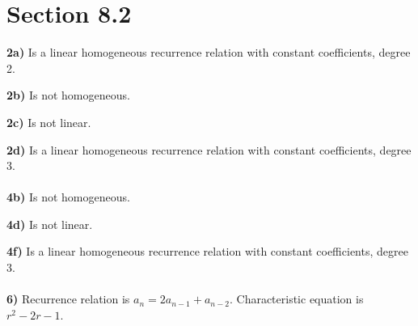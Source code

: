 \documentclass{article}
\begin{document}
\section*{Section 8.2}
\noindent\textbf{2a)} Is a linear homogeneous recurrence relation with constant coefficients, degree 2.

\noindent\textbf{2b)} Is not homogeneous. 

\noindent\textbf{2c)} Is not linear.

\noindent\textbf{2d)} Is a linear homogeneous recurrence relation with constant coefficients, degree 3.
\\\\\noindent\textbf{4b)} Is not homogeneous. 

\noindent\textbf{4d)} Is not linear.

\noindent\textbf{4f)} Is a linear homogeneous recurrence relation with constant coefficients, degree 3.
\\\\\noindent\textbf{6)} Recurrence relation is $a_n = 2a_{n-1}+a_{n-2}$. Characteristic equation is $r^2 -2r-1$.
\end{document}
